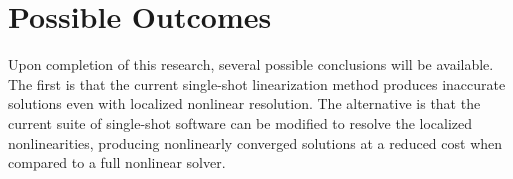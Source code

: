 \section{Possible Outcomes}
\label{sect:possible_outcomes}
Upon completion of this research, several possible conclusions will be available.
The first is that the current single-shot linearization method produces inaccurate solutions even with localized nonlinear resolution.
The alternative is that the current suite of single-shot software can be modified to resolve the localized nonlinearities, producing nonlinearly converged solutions at a reduced cost when compared to a full nonlinear solver.
